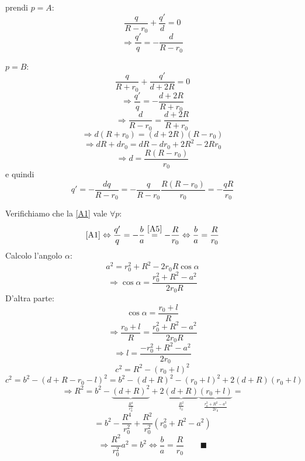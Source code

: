 \documentclass[a4paper,11pt]{report}
\begin{document}
prendi $p=A$:
\begin{equation}
\frac{q}{R-r_0} + \frac{q'}{d}=0
\end{equation}
\[
\Rightarrow \frac{q'}{q}=-\frac{d}{R-r_0}
\]

$p=B$:
\begin{equation}
\frac{q}{R+r_0}+\frac{q'}{d+2R}=0
\end{equation}
\[
\Rightarrow \frac{q'}{q}=-\frac{d+2R}{R+r_0}
\]
\[
\Rightarrow \frac{d}{R-r_0}= \frac{d+2R}{R+r_0}
\]
\[
\Rightarrow d(R+r_0)=(d+2R)(R-r_0)
\]
\[
\Rightarrow dR + dr_0 = dR - dr_0 + 2R^2 - 2Rr_0
\]
\begin{equation}
\Rightarrow d=\frac{R(R-r_0)}{r_0}
\end{equation}
e quindi
\begin{equation}
q' = -\frac{dq}{R-r_0} = -\frac{q}{R-r_0}\frac{R(R-r_0)}{r_0}=-\frac{qR}{r_0}
\label{A5}
\end{equation}

Verifichiamo che la \eqref{A1} vale $\forall p$:
\[
\eqref{A1}\Leftrightarrow \frac{q'}{q} = -\frac{b}{a} \overset{\eqref{A5}}{=} -\frac{R}{r_0} \Leftrightarrow \frac{b}{a}=\frac{R}{r_0}
\]
Calcolo l'angolo $\alpha$: 
\[
a^2=r_0^2 + R^2 - 2r_0 R\cos\alpha
\]
\[
\Rightarrow \cos\alpha =\frac{r_0^2 + R^2 - a^2}{2r_0R}
\]
D'altra parte: 
\[
\cos\alpha=\frac{r_0+l}{R}
\]
\[
\Rightarrow \frac{r_0+l}{R}=\frac{r_0^2 +R^2 - a^2}{2r_0 R}
\]
\[
\Rightarrow l=\frac{-r_0^2 + R^2 - a^2}{2r_0}
\]
\[
c^2=R^2 - (r_0+l)^2 
\]
\[
c^2=b^2 - (d +R-r_0 -l)^2 = b^2 -(d+R)^2 - (r_0+l)^2 + 2(d+R)(r_0+l)
\]
\[
\Rightarrow R^2 = b^2 - \underbrace{(d+R)^2}_{\frac{R^4}{r_0^2}} + 2 \underbrace{(d+R)}_{\frac{R^2}{r_0}} \underbrace{(r_0+l)}_{\frac{r_0^2 + R^2 - a^2}{2r_0}}=
\]
\[
= b^2 - \frac{R^4}{r_0^2} + \frac{R^2}{r_0^2}(r_0^2 + R^2 - a^2)
\]
\[
\Rightarrow \frac{R^2}{r_0^2}a^2 = b^2 \Leftrightarrow \frac{b}{a}=\frac{R}{r_0} \qquad \blacksquare
\]
\end{document}
